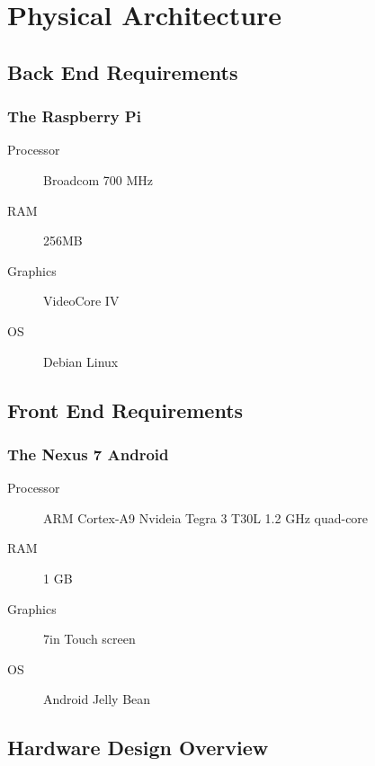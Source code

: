 {
    \renewcommand*{\theenumi}{\thesubsection.\arabic{enumi}}
    \renewcommand*{\theenumii}{\theenumi.\arabic{enumii}}
    \renewcommand*{\theenumiii}{\theenumii.\arabic{enumiii}}

    \section{Physical Architecture}

    \subsection{Back End Requirements}
            
    \subsubsection{The Raspberry Pi}
        \begin{description}
	        \item[Processor] Broadcom 700 MHz
	        \item[RAM]       256MB
	        \item[Graphics]  VideoCore IV
	        \item[OS]        Debian Linux
        \end{description}

    \subsection{Front End Requirements}

    \subsubsection{The Nexus 7 Android}
        \begin{description}
	        \item[Processor] ARM Cortex-A9 Nvideia Tegra 3 T30L 1.2 GHz quad-core
	        \item[RAM]       1 GB
	        \item[Graphics]  7in Touch screen
	        \item[OS]        Android Jelly Bean
        \end{description}
    
    \subsection{Hardware Design Overview}

}
